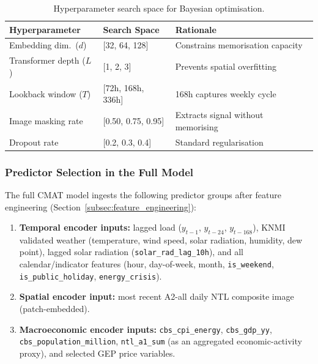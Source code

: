 \begin{table}[htbp]
    \centering
    \caption{Hyperparameter search space for Bayesian optimisation.}
    \label{tab:hyperparams}
    \begin{tabular}{l l l}
        \toprule
        \textbf{Hyperparameter} & \textbf{Search Space} & \textbf{Rationale} \\
        \midrule
        Embedding dim.\ ($d$) & [32, 64, 128] & Constrains memorisation capacity \\
        Transformer depth ($L$) & [1, 2, 3] & Prevents spatial overfitting \\
        Lookback window ($T$) & [72h, 168h, 336h] & 168h captures weekly cycle \\
        Image masking rate & [0.50, 0.75, 0.95] & Extracts signal without memorising \\
        Dropout rate & [0.2, 0.3, 0.4] & Standard regularisation \\
        \bottomrule
    \end{tabular}
\end{table}

\subsubsection{Predictor Selection in the Full Model}
\label{subsubsec:predictor_selection}

The full CMAT model ingests the following predictor groups after feature engineering (Section~\ref{subsec:feature_engineering}):

\begin{enumerate}
    \item \textbf{Temporal encoder inputs:} lagged load ($y_{t-1}$, $y_{t-24}$, $y_{t-168}$), KNMI validated weather (temperature, wind speed, solar radiation, humidity, dew point), lagged solar radiation (\texttt{solar\_rad\_lag\_10h}), and all calendar/indicator features (hour, day-of-week, month, \texttt{is\_weekend}, \texttt{is\_public\_holiday}, \texttt{energy\_crisis}).
    \item \textbf{Spatial encoder input:} most recent A2-all daily NTL composite image (patch-embedded).
    \item \textbf{Macroeconomic encoder inputs:} \texttt{cbs\_cpi\_energy}, \texttt{cbs\_gdp\_yy}, \texttt{cbs\_population\_million}, \texttt{ntl\_a1\_sum} (as an aggregated economic-activity proxy), and selected GEP price variables.
\end{enumerate}

